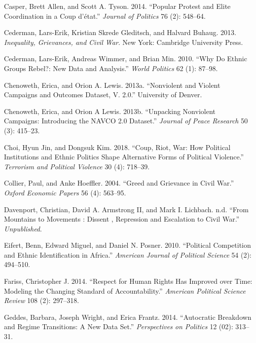 \documentclass[12pt,]{article}
\theoremstyle{definition}
\theoremstyle{definition}
\theoremstyle{definition}
\theoremstyle{remark}
\begin{document}
\leavevmode\hypertarget{ref-Casper2014}{}%
Casper, Brett Allen, and Scott A. Tyson. 2014. ``Popular Protest and
Elite Coordination in a Coup d'état.'' \emph{Journal of Politics} 76
(2): 548--64.

\leavevmode\hypertarget{ref-Cederman2013a}{}%
Cederman, Lars-Erik, Kristian Skrede Gleditsch, and Halvard Buhaug.
2013. \emph{Inequality, Grievances, and Civil War}. New York: Cambridge
University Press.

\leavevmode\hypertarget{ref-Cederman2010}{}%
Cederman, Lars-Erik, Andreas Wimmer, and Brian Min. 2010. ``Why Do
Ethnic Groups Rebel?: New Data and Analysis.'' \emph{World Politics} 62
(1): 87--98.

\leavevmode\hypertarget{ref-Chenoweth2013b}{}%
Chenoweth, Erica, and Orion A. Lewis. 2013a. ``Nonviolent and Violent
Campaigns and Outcomes Dataset, V. 2.0.'' University of Denver.

\leavevmode\hypertarget{ref-Chenoweth2013a}{}%
Chenoweth, Erica, and Orion A Lewis. 2013b. ``Unpacking Nonviolent
Campaigns: Introducing the NAVCO 2.0 Dataset.'' \emph{Journal of Peace
Research} 50 (3): 415--23.

\leavevmode\hypertarget{ref-Choi2018}{}%
Choi, Hyun Jin, and Dongsuk Kim. 2018. ``Coup, Riot, War: How Political
Institutions and Ethnic Politics Shape Alternative Forms of Political
Violence.'' \emph{Terrorism and Political Violence} 30 (4): 718--39.

\leavevmode\hypertarget{ref-Collier2004}{}%
Collier, Paul, and Anke Hoeffler. 2004. ``Greed and Grievance in Civil
War.'' \emph{Oxford Economic Papers} 56 (4): 563--95.

\leavevmode\hypertarget{ref-Davenportnd}{}%
Davenport, Christian, David A. Armstrong II, and Mark I. Lichbach. n.d.
``From Mountains to Movements : Dissent , Repression and Escalation to
Civil War.'' \emph{Unpublished}.

\leavevmode\hypertarget{ref-Eifert2010}{}%
Eifert, Benn, Edward Miguel, and Daniel N. Posner. 2010. ``Political
Competition and Ethnic Identification in Africa.'' \emph{American
Journal of Political Science} 54 (2): 494--510.

\leavevmode\hypertarget{ref-Fariss2014}{}%
Fariss, Christopher J. 2014. ``Respect for Human Rights Has Improved
over Time: Modeling the Changing Standard of Accountability.''
\emph{American Political Science Review} 108 (2): 297--318.

\leavevmode\hypertarget{ref-Geddes2014a}{}%
Geddes, Barbara, Joseph Wright, and Erica Frantz. 2014. ``Autocratic
Breakdown and Regime Transitions: A New Data Set.'' \emph{Perspectives
on Politics} 12 (02): 313--31.
\end{document}
